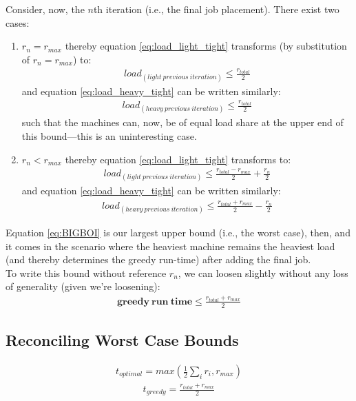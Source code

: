 \documentclass[conference]{styles/acmsiggraph}
\newcommand{\?}{\stackrel{?}{=}}
\begin{document}
Consider, now, the $n$th iteration (i.e., the final job placement).  There exist two cases:
\begin{enumerate}
    \item $r_n = r_{max}$ thereby equation \ref{eq:load_light_tight} transforms (by substitution of $r_n = r_{max}$) to:
    \begin{align}
        load_{(light\ previous\ iteration)} \leq \frac{r_{total}}{2}
    \end{align}
    and equation \ref{eq:load_heavy_tight} can be written similarly:
    \begin{align}
        load_{(heavy\ previous\ iteration)} \leq \frac{r_{total}}{2}
    \end{align}
    such that the machines can, now, be of equal load share at the upper end of this bound---this is an uninteresting case.
    
    \item $r_n < r_{max}$ thereby equation \ref{eq:load_light_tight} transforms to:
    \begin{align}
        load_{(light\ previous\ iteration)} \leq \frac{r_{total}-r_{max}}{2} + \frac{r_{n}}{2}
    \end{align}
    and equation \ref{eq:load_heavy_tight} can be written similarly:
    \begin{align} \label{eq:BIGBOI}
        load_{(heavy\ previous\ iteration)} \leq \frac{r_{total}+r_{max}}{2} - \frac{r_{n}}{2}
    \end{align}
\end{enumerate}

Equation \ref{eq:BIGBOI} is our largest upper bound (i.e., the worst case), then, and it comes in the scenario where the heaviest machine remains the heaviest load (and thereby determines the greedy run-time) after adding the final job. \\

To write this bound without reference $r_n$, we can loosen slightly without any loss of generality (given we're loosening):
\begin{align} \label{eq:LOOSEBOI}
    \mathbf{greedy\ run\ time} \leq \frac{r_{total}+r_{max}}{2}
\end{align}

\newpage
\subsection{Reconciling Worst Case Bounds}
\begin{align} \label{lowerboundOpt}
    t_{optimal} = max\left(\frac{1}{2} \sum_{i}r_i, r_{max}\right)
\end{align}
\begin{align} \label{upperboundGreedy}
    t_{greedy} = \frac{r_{total}+r_{max}}{2}
\end{align}
\end{document}
